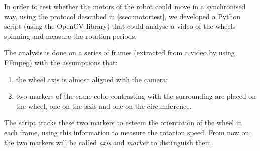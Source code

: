 In order to test whether the motors of the robot could move in a synchronised
way, using the protocol described in \autoref{ssec:motortest}, we developed a
Python script (using the OpenCV library) that could analyse a video of the
wheels spinning and measure the rotation periods.

\beforelist* The analysis is done on a series of frames (extracted from a video
by using FFmpeg) with the assumptions that:
\begin{enumerate}
  \item the wheel axis is almost aligned with the camera;
  \item two markers of the same color contrasting with the surrounding are
    placed on the wheel, one on the axis and one on the circumference.
\end{enumerate}
\afterlist*
The script tracks these two markers to esteem the orientation of the wheel in
each frame, using this information to measure the rotation speed.
From now on, the two markers will be called \emph{axis} and \emph{marker} to
distinguish them.

